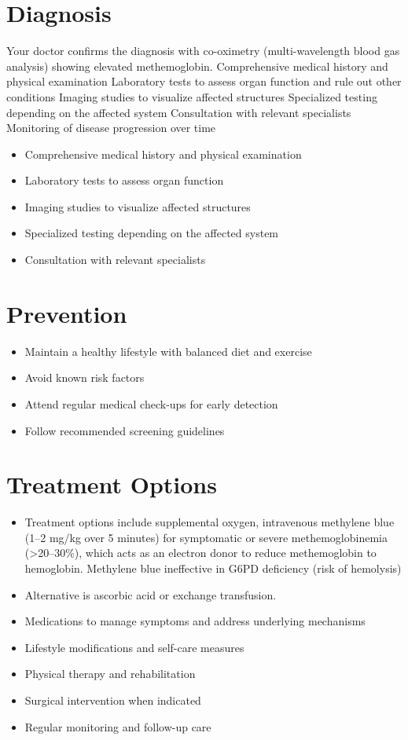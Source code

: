 \section{Diagnosis}
Your doctor confirms the diagnosis with co-oximetry (multi-wavelength blood gas analysis) showing elevated methemoglobin. Comprehensive medical history and physical examination Laboratory tests to assess organ function and rule out other conditions Imaging studies to visualize affected structures Specialized testing depending on the affected system Consultation with relevant specialists Monitoring of disease progression over time

\begin{itemize}[noitemsep]
  \item Comprehensive medical history and physical examination
  \item Laboratory tests to assess organ function
  \item Imaging studies to visualize affected structures
  \item Specialized testing depending on the affected system
  \item Consultation with relevant specialists
\end{itemize}
\section{Prevention}
\begin{itemize}[noitemsep]
  \item Maintain a healthy lifestyle with balanced diet and exercise
  \item Avoid known risk factors
  \item Attend regular medical check-ups for early detection
  \item Follow recommended screening guidelines
\end{itemize}
\section{Treatment Options}
\begin{itemize}[noitemsep]
  \item Treatment options include supplemental oxygen, intravenous methylene blue (1--2 mg/kg over 5 minutes) for symptomatic or severe methemoglobinemia (>20--30\%), which acts as an electron donor to reduce methemoglobin to hemoglobin. Methylene blue ineffective in G6PD deficiency (risk of hemolysis)
  \item Alternative is ascorbic acid or exchange transfusion.
  \item Medications to manage symptoms and address underlying mechanisms
  \item Lifestyle modifications and self-care measures
  \item Physical therapy and rehabilitation
  \item Surgical intervention when indicated
  \item Regular monitoring and follow-up care
\end{itemize}
